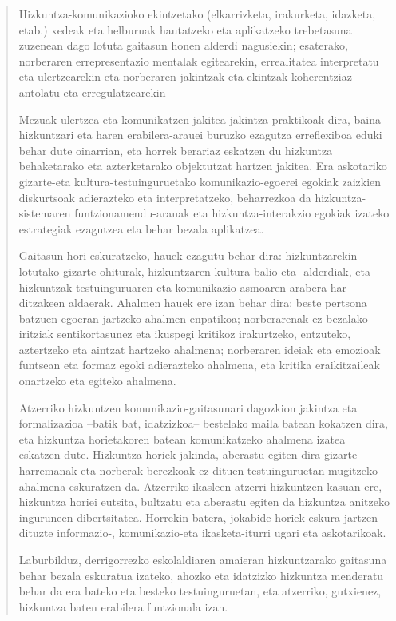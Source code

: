 \documentclass[
]{book}
\begin{document}
\begin{quote}
Hizkuntza-komunikazioko ekintzetako (elkarrizketa, irakurketa, idazketa, etab.) xedeak eta helburuak hautatzeko eta aplikatzeko trebetasuna zuzenean dago lotuta gaitasun honen alderdi nagusiekin; esaterako, norberaren errepresentazio mentalak egitearekin, errealitatea interpretatu eta ulertzearekin eta norberaren jakintzak eta ekintzak koherentziaz antolatu eta erregulatzearekin

Mezuak ulertzea eta komunikatzen jakitea jakintza praktikoak dira, baina hizkuntzari eta haren erabilera-arauei buruzko ezagutza erreflexiboa eduki behar dute oinarrian, eta horrek berariaz eskatzen du hizkuntza behaketarako eta azterketarako objektutzat hartzen jakitea. Era askotariko gizarte-eta kultura-testuinguruetako komunikazio-egoerei egokiak zaizkien diskurtsoak adierazteko eta interpretatzeko, beharrezkoa da hizkuntza-sistemaren funtzionamendu-arauak eta hizkuntza-interakzio egokiak izateko estrategiak ezagutzea eta behar bezala aplikatzea.

Gaitasun hori eskuratzeko, hauek ezagutu behar dira: hizkuntzarekin lotutako gizarte-ohiturak, hizkuntzaren kultura-balio eta -alderdiak, eta hizkuntzak testuinguruaren eta komunikazio-asmoaren arabera har ditzakeen aldaerak. Ahalmen hauek ere izan behar dira: beste pertsona batzuen egoeran jartzeko ahalmen enpatikoa; norberarenak ez bezalako iritziak sentikortasunez eta ikuspegi kritikoz irakurtzeko, entzuteko, aztertzeko eta aintzat hartzeko ahalmena; norberaren ideiak eta emozioak funtsean eta formaz egoki adierazteko ahalmena, eta kritika eraikitzaileak onartzeko eta egiteko ahalmena.

Atzerriko hizkuntzen komunikazio-gaitasunari dagozkion jakintza eta formalizazioa --batik bat, idatzizkoa-- bestelako maila batean kokatzen dira, eta hizkuntza horietakoren batean komunikatzeko ahalmena izatea eskatzen dute. Hizkuntza horiek jakinda, aberastu egiten dira gizarte-harremanak eta norberak berezkoak ez dituen testuinguruetan mugitzeko ahalmena eskuratzen da. Atzerriko ikasleen atzerri-hizkuntzen kasuan ere, hizkuntza horiei eutsita, bultzatu eta aberastu egiten da hizkuntza anitzeko inguruneen dibertsitatea. Horrekin batera, jokabide horiek eskura jartzen dituzte informazio-, komunikazio-eta ikasketa-iturri ugari eta askotarikoak.

Laburbilduz, derrigorrezko eskolaldiaren amaieran hizkuntzarako gaitasuna behar bezala eskuratua izateko, ahozko eta idatzizko hizkuntza menderatu behar da era bateko eta besteko testuinguruetan, eta atzerriko, gutxienez, hizkuntza baten erabilera funtzionala izan.
\end{quote}
\end{document}
